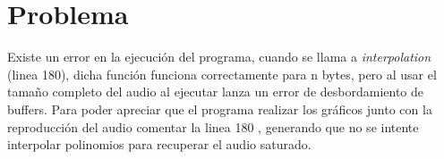 \documentclass[]{article}
\begin{document}
\section{Problema}
Existe un error en la ejecución del programa, cuando se llama a \textit{interpolation} (linea 180), dicha función funciona correctamente para n bytes, pero al usar el tamaño completo del audio al ejecutar lanza un error de desbordamiento de buffers. 
Para poder apreciar que el programa realizar los gráficos junto con la reproducción del audio comentar la linea 180 , generando que no se intente interpolar polinomios para recuperar el audio saturado.
\end{document}
